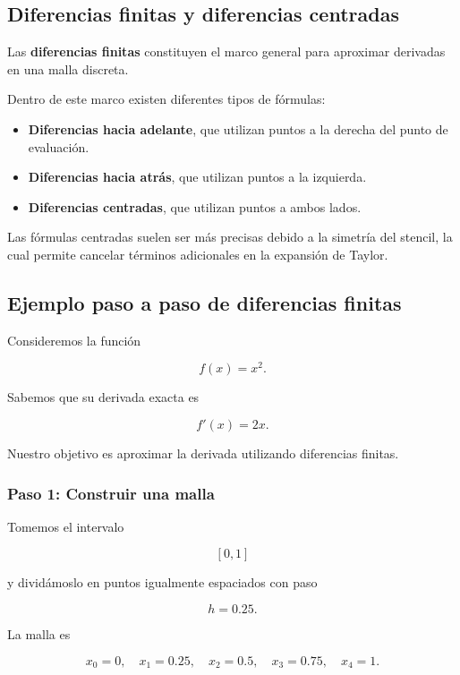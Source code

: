 \documentclass[12pt,a4paper]{article}
\theoremstyle{definition}
\theoremstyle{remark}
\begin{document}
\subsection{Diferencias finitas y diferencias centradas}

Las \textbf{diferencias finitas} constituyen el marco general para aproximar
derivadas en una malla discreta.

Dentro de este marco existen diferentes tipos de fórmulas:

\begin{itemize}

\item \textbf{Diferencias hacia adelante}, que utilizan puntos a la derecha
del punto de evaluación.

\item \textbf{Diferencias hacia atrás}, que utilizan puntos a la izquierda.

\item \textbf{Diferencias centradas}, que utilizan puntos a ambos lados.

\end{itemize}

Las fórmulas centradas suelen ser más precisas debido a la simetría del stencil,
la cual permite cancelar términos adicionales en la expansión de Taylor.

\subsection{Ejemplo paso a paso de diferencias finitas}

Consideremos la función

\[
f(x)=x^2.
\]

Sabemos que su derivada exacta es

\[
f'(x)=2x.
\]

Nuestro objetivo es aproximar la derivada utilizando diferencias finitas.

\subsubsection*{Paso 1: Construir una malla}

Tomemos el intervalo

\[
[0,1]
\]

y dividámoslo en puntos igualmente espaciados con paso

\[
h=0.25.
\]

La malla es

\[
x_0=0,\quad x_1=0.25,\quad x_2=0.5,\quad x_3=0.75,\quad x_4=1.
\]
\end{document}
